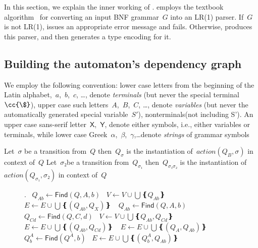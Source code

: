 In this section, we explain the inner working of \Self.
\Self employs the textbook algorithm~\cite{Aho:86} for converting an input
  BNF grammar~$G$ into an LR(1) parser.
If~$G$ is not LR(1), \Self issues an
  appropriate error message and fails.
Otherwise, \Self produces this parser, and
  then generates a \Java type encoding for it.


\subsection{Building the automaton's dependency graph}

  We employ the following convention:
  lower case letters from the beginning of the Latin alphabet,~$a$,~$b$,~$c$, …,
  denote \emph{terminals} (but never the special terminal~$\cc{\$}$),
    upper case such letters~$A$,~$B$,~$C$, …, denote \emph{variables}
  (but never the automatically generated special variable~$S'$),
  nonterminals(not including S').
  An upper case sans-serif letter~$\mathsf X$,~$\mathsf Y$, denote
    either symbols, i.e., either variables or terminals,
    while lower case Greek~$α$,~$β$,~$γ$,…denote \emph{strings} of grammar symbols

    Let~$σ$ be a transition from~$Q$ then~$Q_{σ}$
    is the instantiation of~$action(Q_{B},σ)$ in context
    of~$Q$
    Let~$σ₂$be a transition from~$Q_{σ₁}$ then~$Q_{σ₁σ₂}$
    is the instantiation of~$action(Q_{σ₁},σ₂)$
    in context of~$Q$
\begin{figure}
  \begin{algorithmic}[1]
    .
     
    \ENDFOR
    \STATE~$Q_{Ab}←\textsf{Find}(Q,A,b)$
    \STATE~$V←V∪\bigcup❴ Q_{Ab}❵~$
    \STATE~$E←E∪\bigcup❴ (Q_{Ab},Q_{X})❵~$
    \ENDFOR
    \STATE~$Q_{Ab}←\textsf{Find}(Q,A,b)$
    \STATE~$Q_{Cd}←\textsf{Find}(Q,C,d)$
    \STATE~$V←V∪\bigcup❴ Q_{Ab},Q_{Cd}❵~$
    \STATE~$E←E∪\bigcup❴ (Q_{Ab},Q_{Cd})❵~$
    \ENDIF
    \ENDFOR
    \STATE~$E←E∪\bigcup❴ (Q_{A},Q_{Ab})❵~$
    \STATE~$Q_{b}^{A}←\textsf{Find}(Q^{A},b)$
    \STATE~$E←E∪\bigcup❴ (Q_{b}^{A},Q_{Ab})❵~$
    \ENDFOR
    \ENDFOR
  \end{algorithmic}
\end{figure}

